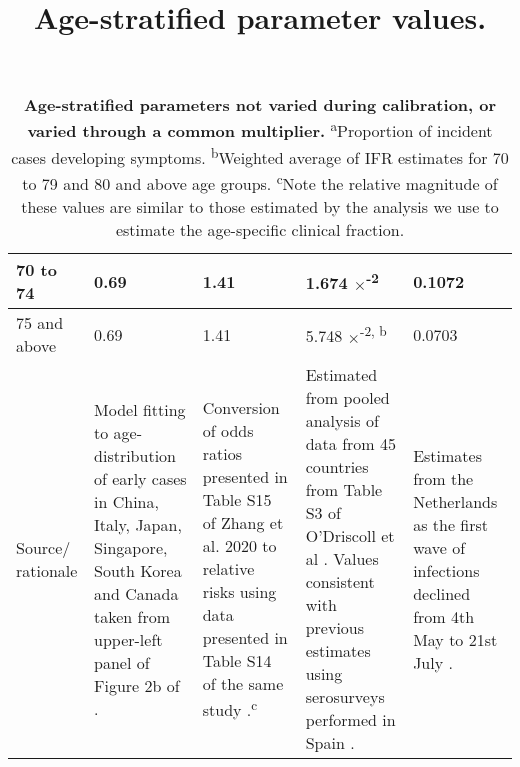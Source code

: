 \begin{table}[ht]
\begin{tabular}[ht]{| p{2cm} | p{2.5cm} | p{3cm} | p{3cm} | p{2.5cm}|}
        \hline
        70 to 74 & 0.69 & 1.41 & 1.674 $\times$\textsuperscript{-2} & 0.1072 \\
        \hline
        75 and above & 0.69 & 1.41 & 5.748 $\times$\textsuperscript{-2, b} & 0.0703 \\
        \hline
        Source/ rationale & 
        Model fitting to age-distribution of early cases in China, Italy, Japan, Singapore, South Korea and Canada taken from upper-left panel of Figure 2b of \cite{RN33}. & 
        Conversion of odds ratios presented in Table S15 of Zhang et al. 2020 to relative risks using data presented in Table S14 of the same study \cite{RN7}.\textsuperscript{c} &
        Estimated from pooled analysis of data from 45 countries from Table S3 of O'Driscoll et al \cite{RN6}. Values consistent with previous estimates using serosurveys performed in Spain \cite{RN21}. &
        Estimates from the Netherlands as the first wave of infections declined from 4th May to 21st July \cite{RN9}. \\ \hline
	\end{tabular}
	\title{Age-stratified parameter values.}
	\caption{\textbf{Age-stratified parameters not varied during calibration, or varied through a common multiplier.} \textsuperscript{a}Proportion of incident cases developing symptoms. \textsuperscript{b}Weighted average of IFR estimates for 70 to 79 and 80 and above age groups. \textsuperscript{c}Note the relative magnitude of these values are similar to those estimated by the analysis we use to estimate the age-specific clinical fraction.}
\end{table}

\clearpage